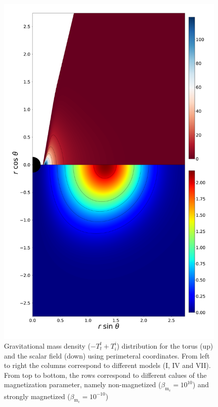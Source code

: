 \documentclass[twocolumn,aps,showpacs,showkeys,prd,superscriptaddress,byrevtex, amsmath]{revtex4-1}
\begin{document}
\begin{figure}
\includegraphics[scale=0.12]{figures/fig6_VII__10.pdf}
\hspace{-0.2cm}
\caption{Gravitational mass density ($-T^t_t+T^i_i$) distribution for the torus (up) and the scalar field (down) using perimeteral coordinates. From left to right the columns correspond to different models (I, IV and VII). From top to bottom, the rows correspond to different calues of the magnetization parameter, namely non-magnetized ($\beta_{\mathrm{m}_{\mathrm{c}}} = 10^{10}$) and strongly magnetized ($\beta_{\mathrm{m}_{\mathrm{c}}} = 10^{-10}$)}
\label{comparison_mass_density_peri}
\end{figure}
\end{document}
